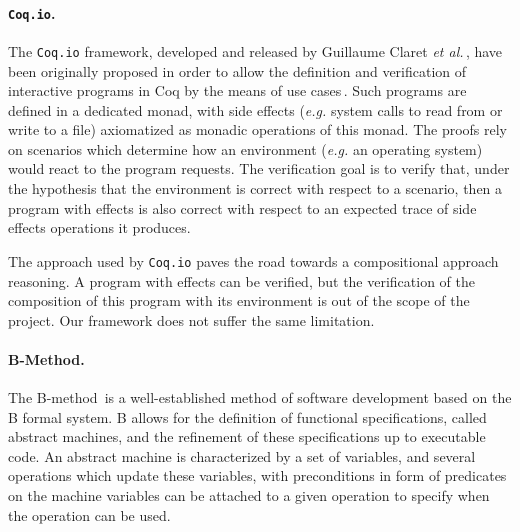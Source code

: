 \paragraph{\texttt{Coq.io}.}
%
The \texttt{Coq.io} framework, developed and released by Guillaume Claret
\emph{et al.}\,\cite{claret2015coqiowww}, have been originally proposed in order
to allow the definition and verification of interactive programs in Coq by the
means of use cases\,\cite{claret2015coqio}.
%
Such programs are defined in a dedicated monad, with side effects (\emph{e.g.}
system calls to read from or write to a file) axiomatized as monadic operations
of this monad.
%
The proofs rely on scenarios which determine how an environment (\emph{e.g.} an
operating system) would react to the program requests.
%
The verification goal is to verify that, under the hypothesis that the
environment is correct with respect to a scenario, then a program with effects
is also correct with respect to an expected trace of side effects operations it
produces.

The approach used by \texttt{Coq.io} paves the road towards a compositional
approach reasoning.
%
A program with effects can be verified, but the verification of the composition
of this program with its environment is out of the scope of the project.
%
Our framework does not suffer the same limitation.

\paragraph{B-Method.}
%
The B-method\,\cite{abrial2005b} is a well-established method of software
development based on the B formal system.
%
B allows for the definition of functional specifications, called abstract
machines, and the refinement of these specifications up to executable code.
%
An abstract machine is characterized by a set of variables, and several
operations which update these variables, with preconditions in form of
predicates on the machine variables can be attached to a given operation to
specify when the operation can be used.

